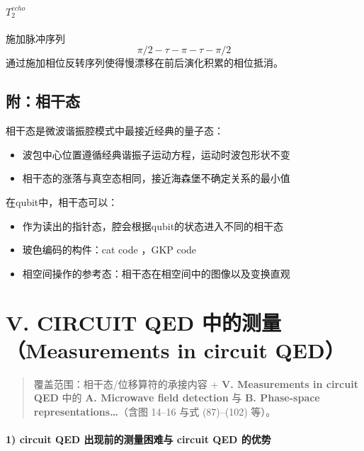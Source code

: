 \documentclass[12pt,a4paper,oneside]{ctexbook}
\let\oldparagraph\paragraph
\renewcommand{\paragraph}[1]{\oldparagraph{#1}\mbox{}}
\begin{document}
\paragraph{$T_{2}^{echo}$}
施加脉冲序列$$\pi/2 - \tau - \pi - \tau - \pi/2$$
通过施加相位反转序列使得慢漂移在前后演化积累的相位抵消。

\subsection{附：相干态}
相干态是微波谐振腔模式中最接近经典的量子态：
\begin{itemize}
  \item 波包中心位置遵循经典谐振子运动方程，运动时波包形状不变
  \item 相干态的涨落与真空态相同，接近海森堡不确定关系的最小值
\end{itemize}
在qubit中，相干态可以：
\begin{itemize}
  \item 作为读出的指针态，腔会根据qubit的状态进入不同的相干态
  \item 玻色编码的构件：cat code ，GKP code
  \item 相空间操作的参考态：相干态在相空间中的图像以及变换直观
\end{itemize}
\section{V. CIRCUIT QED 中的测量（Measurements in circuit
QED）}\label{v.-circuit-qed-ux4e2dux7684ux6d4bux91cfmeasurements-in-circuit-qed}
\begin{quote}
覆盖范围：相干态/位移算符的承接内容 + \textbf{V. Measurements in circuit
QED} 中的 \textbf{A. Microwave field detection} 与 \textbf{B.
Phase-space representations\ldots{}}（含图 14--16 与式 (87)--(102)
等）。
\end{quote}
\paragraph{1) circuit QED 出现前的测量困难与 circuit QED
的优势}\label{circuit-qed-ux51faux73b0ux524dux7684ux6d4bux91cfux56f0ux96beux4e0e-circuit-qed-ux7684ux4f18ux52bf}
\end{document}
